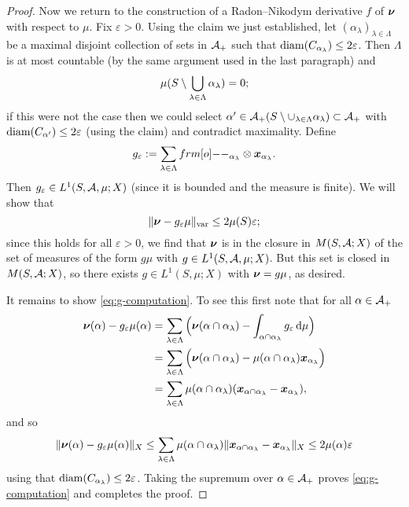\begin{proof}
  Now we return to the construction of a Radon--Nikodym derivative $f$ of $\bm{\nu}$ with respect to $\mu$.
  Fix $\varepsilon > 0$.
  Using the claim we just established, let $(\alpha_{\lambda})_{\lambda \in \Lambda}$ be a maximal disjoint collection of sets in $\mathcal{A}_+$ such that $\operatorname{diam}(C_{\alpha_{\lambda}}) \leq 2\varepsilon$.
  Then $\Lambda$ is at most countable (by the same argument used in the last paragraph) and
  \begin{equation*}
    \mu(S \setminus \bigcup_{\lambda \in \Lambda} \alpha_{\lambda}) = 0;
  \end{equation*}
  if this were not the case then we could select $\alpha' \in \mathcal{A}_+(S \setminus \cup_{\lambda \in \Lambda} \alpha_{\lambda}) \subset \mathcal{A}_+$ with $\operatorname{diam}(C_{\alpha'}) \leq 2\varepsilon$ (using the claim) and contradict maximality.
  Define
  \begin{equation*}
    g_{\varepsilon} := \sum_{\lambda \in \Lambda} \1_{\alpha_{\lambda}} \otimes \mb{x}_{\alpha_{\lambda}}.
  \end{equation*}
  Then $g_{\varepsilon} \in L^1(S,\mathcal{A},\mu;X)$ (since it is bounded and the measure is finite).
  We will show that
  \begin{equation}\label{eq:g-computation}
    \|\bm{\nu} - g_{\varepsilon}\mu\|_{\mathrm{var}} \leq 2\mu(S)\varepsilon;
  \end{equation}
  since this holds for all $\varepsilon > 0$, we find that $\bm{\nu}$ is in the closure in $M(S,\mathcal{A};X)$ of the set of measures of the form $g\mu$ with $g \in L^1(S,\mathcal{A},\mu;X)$.
  But this set is closed in $M(S,\mathcal{A};X)$, so there exists $g \in L^1(S,\mu;X)$ with $\bm{\nu} = g\mu$, as desired.

  It remains to show \eqref{eq:g-computation}.
  To see this first note that for all $\alpha \in \mathcal{A}_+$
  \begin{equation*}
    \begin{aligned}
      \bm{\nu}(\alpha) - g_\varepsilon\mu(\alpha)
      &= \sum_{\lambda \in \Lambda} \Big(  \bm{\nu}(\alpha \cap \alpha_{\lambda}) - \int_{\alpha \cap \alpha_{\lambda}} g_{\varepsilon} \, \mathrm{d}\mu \Big) \\
      &= \sum_{\lambda \in \Lambda} \Big(  \bm{\nu}(\alpha \cap \alpha_{\lambda}) - \mu(\alpha \cap \alpha_{\lambda}) \bm{x}_{\alpha_{\lambda}} \Big) \\
      &= \sum_{\lambda \in \Lambda} \mu(\alpha \cap \alpha_{\lambda})(\bm{x}_{\alpha \cap \alpha_{\lambda}} - \bm{x}_{\alpha_{\lambda}}),
    \end{aligned}
  \end{equation*}
  and so
  \begin{equation*}
      \|\bm{\nu}(\alpha) - g_\varepsilon\mu(\alpha)\|_{X}
      \leq \sum_{\lambda \in \Lambda} \mu(\alpha \cap \alpha_{\lambda}) \|\bm{x}_{\alpha \cap \alpha_{\lambda}} - \bm{x}_{\alpha_{\lambda}}\|_{X} \leq 2\mu(\alpha)\varepsilon
    \end{equation*}
    using that $\operatorname{diam}(C_{\alpha_{\lambda}}) \leq 2\varepsilon$.
    Taking the supremum over $\alpha \in \mathcal{A}_{+}$ proves \eqref{eq:g-computation} and completes the proof.
  \end{proof}
  
